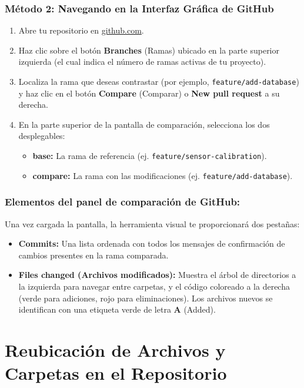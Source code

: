 \documentclass[
10pt, %
a4paper, %
oneside, %
headinclude,footinclude, %
BCOR5mm, %
]{scrartcl}
\begin{document}
\subsubsection{Método 2: Navegando en la Interfaz Gráfica de GitHub}
\begin{enumerate}
	\item Abre tu repositorio en \href{https://github.com}{github.com}.
	\item Haz clic sobre el botón \textbf{Branches} (Ramas) ubicado en la parte superior izquierda (el cual indica el número de ramas activas de tu proyecto).
	\item Localiza la rama que deseas contrastar (por ejemplo, \texttt{feature/add-database}) y haz clic en el botón \textbf{Compare} (Comparar) o \textbf{New pull request} a su derecha.
	\item En la parte superior de la pantalla de comparación, selecciona los dos desplegables:
	\begin{itemize}
		\item \textbf{base:} La rama de referencia (ej. \texttt{feature/sensor-calibration}).
		\item \textbf{compare:} La rama con las modificaciones (ej. \texttt{feature/add-database}).
	\end{itemize}
\end{enumerate}

\subsubsection{Elementos del panel de comparación de GitHub:}
Una vez cargada la pantalla, la herramienta visual te proporcionará dos pestañas:
\begin{itemize}
	\item \textbf{Commits:} Una lista ordenada con todos los mensajes de confirmación de cambios presentes en la rama comparada.
	\item \textbf{Files changed (Archivos modificados):} Muestra el árbol de directorios a la izquierda para navegar entre carpetas, y el código coloreado a la derecha (verde para adiciones, rojo para eliminaciones). Los archivos nuevos se identifican con una etiqueta verde de letra \textbf{A} (Added).
\end{itemize}

\newpage
\section{Reubicación de Archivos y Carpetas en el Repositorio}
\end{document}
